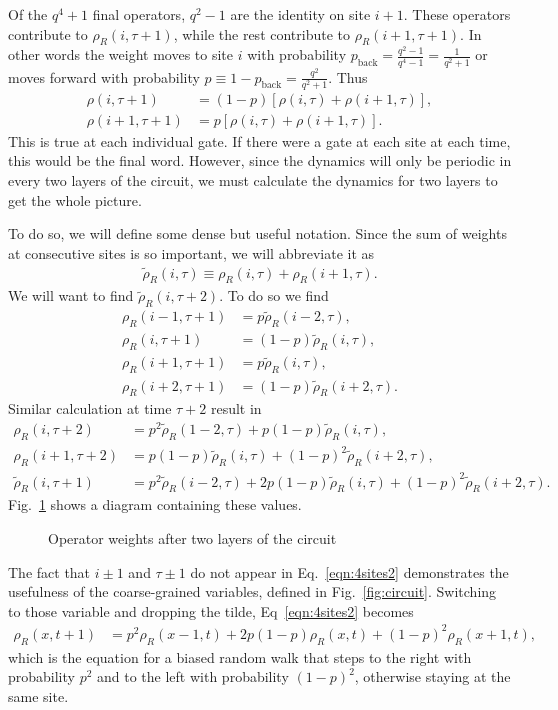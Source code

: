 \documentclass[a4paper,12pt]{article}
\renewcommand{\th}[1]{\frac{1}{#1}}
\renewcommand{\t}{\tau}
\newcommand{\nn}{\nonumber\\}
\begin{document}
Of the $q^4+1$ final operators, $q^2-1$ are the identity on site $i+1$. These operators contribute to $\rho_R(i,\tau+1)$, while the rest contribute to $\rho_R(i+1, \tau+1)$. In other words the weight moves to site $i$ with probability $p_\text{back} = \frac{q^2-1}{q^4-1} = \th{q^2+1}$ or moves forward with probability $p\equiv 1- p_\text{back} = \frac{q^2}{q^2+1}$. Thus
\begin{align}
\rho(i,\t+1) &= (1-p)\left[\rho(i,\t)+\rho(i+1,\t)\right],\nn
\rho(i+1,\t+1) &= p\left[\rho(i,\t)+\rho(i+1,\t)\right].
\end{align}
This is true at each individual gate. If there were a gate at each site at each time, this would be the final word. However, since the dynamics will only be periodic in every two layers of the circuit, we must calculate the dynamics for two layers to get the whole picture.

To do so, we will define some dense but useful notation. Since the sum of weights at consecutive sites is so important, we will abbreviate it as
\begin{align}
\tilde{\rho}_R(i,\t) \equiv \rho_R(i,\tau) + \rho_R(i+1, \tau). \label{eqn:rhotil}
\end{align}
We will want to find $\tilde{\rho}_R(i,\t+2)$. To do so we find
\begin{align}
\rho_R(i-1, \t+1) &=    p  \tilde{\rho}_R(i-2, \t),\nn
\rho_R(i  , \t+1) &= (1-p) \tilde{\rho}_R(i  , \t),\nn
\rho_R(i+1, \t+1) &=    p  \tilde{\rho}_R(i  , \t),\nn
\rho_R(i+2, \t+1) &= (1-p) \tilde{\rho}_R(i+2, \t).\label{eqn:4sites1}
\end{align}
Similar calculation at time $\t+2$ result in
\begin{align}
\rho_R(i  , \t+2) &= p^2\tilde{\rho}_R(1-2,\t) + p(1-p)\tilde{\rho}_R(i,\t),\nn
\rho_R(i+1, \t+2) &= p(1-p)\tilde{\rho}_R(i,\t) + (1-p)^2\tilde{\rho}_R(i+2,
	\t), \nn
\tilde{\rho}_R(i,\t+1)&=p^2\tilde{\rho}_R(i-2,\t)+2p(1-p)\tilde{\rho}_R(i,\t)+
	(1-p)^2\tilde{\rho}_R(i+2,\t). \label{eqn:4sites2}
\end{align}
Fig.~\ref{fig:4sites} shows a diagram containing these values.
\begin{figure}
	\centering
	
	\caption{Operator weights after two layers of the circuit}
	\label{fig:4sites}
\end{figure}

The fact that $i\pm1$ and $\t\pm1$ do not appear in Eq.~\ref{eqn:4sites2} demonstrates the usefulness of the coarse-grained variables, defined in Fig.~\ref{fig:circuit}. Switching to those variable and dropping the tilde, Eq~\ref{eqn:4sites2} becomes
\begin{align}
\rho_R(x,t+1)&=p^2\rho_R(x-1,t)+2p(1-p)\rho_R(x,t)+(1-p)^2\rho_R(x+1,t), 
	\label{eqn:4sites3}
\end{align}
which is the equation for a biased random walk that steps to the right with probability $p^2$ and to the left with probability $(1-p)^2$, otherwise staying at the same site. 
\end{document}
